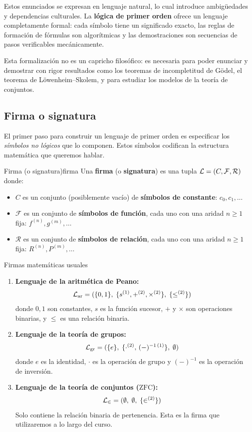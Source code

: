 Estos enunciados se expresan en lenguaje natural, lo cual introduce ambigüedades y dependencias culturales. La \textbf{lógica de primer orden} ofrece un lenguaje completamente formal: cada símbolo tiene un significado exacto, las reglas de formación de fórmulas son algorítmicas y las demostraciones son secuencias de pasos verificables mecánicamente.

Esta formalización no es un capricho filosófico: es necesaria para poder enunciar y demostrar con rigor resultados como los teoremas de incompletitud de Gödel, el teorema de Löwenheim–Skolem, y para estudiar los modelos de la teoría de conjuntos.

\subsection{Firma o signatura}

El primer paso para construir un lenguaje de primer orden es especificar los \emph{símbolos no lógicos} que lo componen. Estos símbolos codifican la estructura matemática que queremos hablar.

\begin{definicion}{Firma (o signatura)}{firma}
Una \textbf{firma} (o \textbf{signatura}) es una tupla $\mathcal{L} = (C, \mathcal{F}, \mathcal{R})$ donde:
\begin{itemize}[leftmargin=2em]
  \item $C$ es un conjunto (posiblemente vacío) de \textbf{símbolos de constante}: $c_0, c_1, \ldots$
  \item $\mathcal{F}$ es un conjunto de \textbf{símbolos de función}, cada uno con una aridad $n \geq 1$ fija: $f^{(n)}, g^{(m)}, \ldots$
  \item $\mathcal{R}$ es un conjunto de \textbf{símbolos de relación}, cada uno con una aridad $n \geq 1$ fija: $R^{(n)}, P^{(m)}, \ldots$
\end{itemize}
\end{definicion}

\begin{ejemplo}{Firmas matemáticas usuales}{}
\begin{enumerate}[leftmargin=2em, label=(\alph*)]
  \item \textbf{Lenguaje de la aritmética de Peano:}
    \[
      \mathcal{L}_{\mathrm{ar}} = (\{0,1\},\; \{s^{(1)}, +^{(2)}, \times^{(2)}\},\; \{\leq^{(2)}\})
    \]
    donde $0,1$ son constantes, $s$ es la función sucesor, $+$ y $\times$ son operaciones binarias, y $\leq$ es una relación binaria.

  \item \textbf{Lenguaje de la teoría de grupos:}
    \[
      \mathcal{L}_{\mathrm{gr}} = (\{e\},\; \{\cdot^{(2)},\, (-)^{-1\,(1)}\},\; \emptyset)
    \]
    donde $e$ es la identidad, $\cdot$ es la operación de grupo y $(-)^{-1}$ es la operación de inversión.

  \item \textbf{Lenguaje de la teoría de conjuntos ($\mathrm{ZFC}$):}
    \[
      \mathcal{L}_{\in} = (\emptyset,\; \emptyset,\; \{\in^{(2)}\})
    \]
    Solo contiene la relación binaria de pertenencia. Esta es la firma que utilizaremos a lo largo del curso.
\end{enumerate}
\end{ejemplo}

